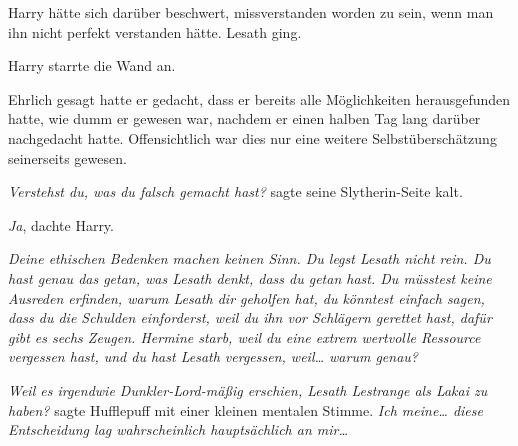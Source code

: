 
Harry hätte sich darüber beschwert, missverstanden worden zu sein, wenn man ihn nicht perfekt verstanden hätte. Lesath ging.

Harry starrte die Wand an.


Ehrlich gesagt hatte er gedacht, dass er bereits alle Möglichkeiten herausgefunden hatte, wie dumm er gewesen war, nachdem er einen halben Tag lang darüber nachgedacht hatte. Offensichtlich war dies nur eine weitere Selbstüberschätzung seinerseits gewesen.

\emph{Verstehst du, was du falsch gemacht hast?} sagte seine Slytherin-Seite kalt.

\emph{Ja}, dachte Harry.

\emph{Deine ethischen Bedenken machen keinen Sinn. Du legst Lesath nicht rein. Du hast genau das getan, was Lesath denkt, dass du getan hast. Du müsstest keine Ausreden erfinden, warum Lesath dir geholfen hat, du könntest einfach sagen, dass du die Schulden einforderst, weil du ihn vor Schlägern gerettet hast, dafür gibt es sechs Zeugen. Hermine starb, weil du eine extrem wertvolle Ressource vergessen hast, und du hast Lesath vergessen, weil… warum genau?}

\emph{Weil es irgendwie Dunkler-Lord-mäßig erschien, Lesath Lestrange als Lakai zu haben?} sagte Hufflepuff mit einer kleinen mentalen Stimme. \emph{Ich meine… diese Entscheidung lag wahrscheinlich hauptsächlich an mir…}

